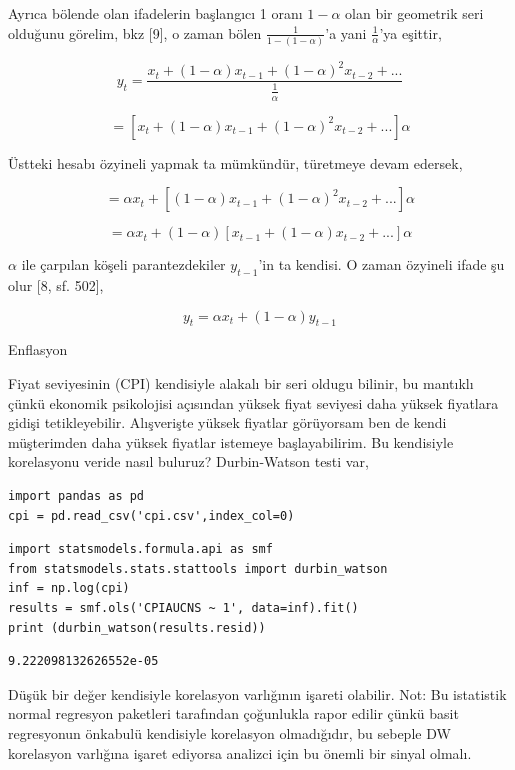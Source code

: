 \documentclass[12pt,fleqn]{article}\usepackage{../../common}
\begin{document}
Ayrıca bölende olan ifadelerin başlangıcı 1 oranı $1-\alpha$ olan bir
geometrik seri olduğunu görelim, bkz [9], o zaman bölen
$\frac{1}{1-(1-\alpha)}$'a yani $\frac{1}{\alpha}$'ya eşittir,

$$ y_t = \frac{x_t + (1-\alpha)x_{t-1} + (1-\alpha)^2x_{t-2} + ... }
{\frac{1}{\alpha}}
$$

$$  = [ x_t + (1-\alpha)x_{t-1} + (1-\alpha)^2x_{t-2} + ... ] \alpha $$

Üstteki hesabı özyineli yapmak ta mümkündür, türetmeye devam edersek,

$$  = \alpha x_t + [(1-\alpha)x_{t-1} + (1-\alpha)^2x_{t-2} + ... ]\alpha $$

$$  = \alpha x_t + (1-\alpha) [x_{t-1} + (1-\alpha)x_{t-2} + ... ]\alpha $$

$\alpha$ ile çarpılan köşeli parantezdekiler $y_{t-1}$'in ta kendisi. O
zaman özyineli ifade şu olur [8, sf. 502],

$$ y_t = \alpha x_t + (1-\alpha) y_{t-1}$$

Enflasyon

Fiyat seviyesinin (CPI) kendisiyle alakalı bir seri oldugu bilinir, bu mantıklı
çünkü ekonomik psikolojisi açısından yüksek fiyat seviyesi daha yüksek fiyatlara
gidişi tetikleyebilir. Alışverişte yüksek fiyatlar görüyorsam ben de kendi
müşterimden daha yüksek fiyatlar istemeye başlayabilirim. Bu kendisiyle
korelasyonu veride nasıl buluruz? Durbin-Watson testi var,

\begin{verbatim}
import pandas as pd
cpi = pd.read_csv('cpi.csv',index_col=0)
\end{verbatim}

\begin{verbatim}
import statsmodels.formula.api as smf
from statsmodels.stats.stattools import durbin_watson
inf = np.log(cpi)
results = smf.ols('CPIAUCNS ~ 1', data=inf).fit()
print (durbin_watson(results.resid))
\end{verbatim}

\begin{verbatim}
9.222098132626552e-05
\end{verbatim}

Düşük bir değer kendisiyle korelasyon varlığının işareti olabilir. Not: Bu
istatistik normal regresyon paketleri tarafından çoğunlukla rapor edilir çünkü
basit regresyonun önkabulü kendisiyle korelasyon olmadığıdır, bu sebeple DW
korelasyon varlığına işaret ediyorsa analizci için bu önemli bir sinyal olmalı.
\end{document}
